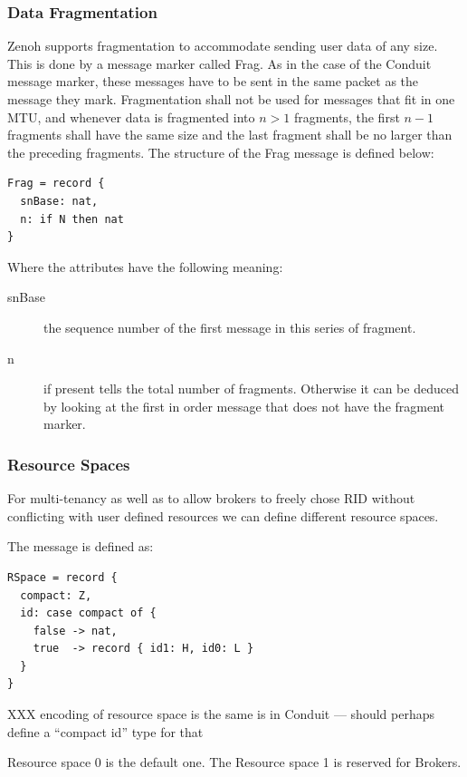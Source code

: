\documentclass[a4paper,oneside,article]{memoir}
\begin{document}
\subsubsection{Data Fragmentation}

Zenoh supports fragmentation to accommodate sending user data of any size.  This is done by a message
marker called Frag.  As in the case of the Conduit message marker, these messages have to be sent in
the same packet as the message they mark.  Fragmentation shall not be used for messages that fit in
one MTU, and whenever data is fragmented into $n > 1$ fragments, the first $n - 1$ fragments shall
have the same size and the last fragment shall be no larger than the preceding fragments.  The
structure of the Frag message is defined below:
\begin{verbatim}
Frag = record {
  snBase: nat,
  n: if N then nat
}
\end{verbatim}
Where the attributes have the following meaning:
\begin{description}
\item[snBase] the sequence number of the first message in this series of fragment.
\item[n] if present tells the total number of fragments. Otherwise it can be deduced by looking at
  the first in order message that does not have the fragment marker.
\end{description}

\subsubsection{Resource Spaces}

For multi-tenancy as well as to allow brokers to freely chose RID without conflicting with user
defined resources we can define different resource spaces.

The message is defined as:
\begin{verbatim}
RSpace = record {
  compact: Z,
  id: case compact of {
    false -> nat,
    true  -> record { id1: H, id0: L }
  }
}
\end{verbatim}

XXX encoding of resource space is the same is in Conduit --- should perhaps define a ``compact id'' type for that

Resource space 0 is the default one. The Resource space 1 is reserved for Brokers.
\end{document}
